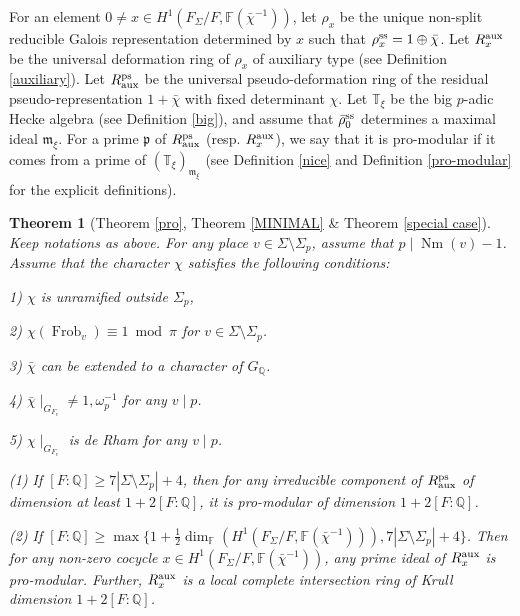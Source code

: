 \documentclass[12pt]{amsart}
\theoremstyle{plain}
\newtheorem{thm}{Theorem}[subsection]
\theoremstyle{definition}
\theoremstyle{remark}
\begin{document}
For an element $0 \ne x \in H^1(F_{\Sigma}/F, \mathbb{F}(\bar{\chi}^{-1}))$, let $\rho_x$ be the unique non-split reducible Galois representation determined by $x$ such that $\rho_x^{\textnormal{ss}}=1 \oplus \bar{\chi}$. Let $R_x^\textnormal{aux}$ be the universal deformation ring of $\rho_x$ of auxiliary type (see Definition \ref{auxiliary}).
  Let $R_\textnormal{aux}^\textnormal{ps} $ be the universal pseudo-deformation ring of the residual pseudo-representation $1+\bar{\chi}$ with fixed determinant $\chi$. Let $\mathbb{T}_{\xi}$ be the big $p$-adic Hecke algebra (see Definition \ref{big}), and assume that $ \bar{\rho}_0^{\textnormal{ss}}$ determines a maximal ideal $\mathfrak{m}_{\xi}$. For a prime $\mathfrak{p}$ of $R_\textnormal{aux}^\textnormal{ps} $ (resp. $R_x^\textnormal{aux}$), we say that it is pro-modular if it comes from a prime of $(\mathbb{T}_{\xi})_{\mathfrak{m}_{\xi}}$ (see Definition \ref{nice} and Definition \ref{pro-modular} for the explicit definitions). 


\begin{thm} [Theorem \ref{pro}, Theorem \ref{MINIMAL} \& Theorem \ref{special case}] \label{main} Keep notations as above. For any place $v \in \Sigma \setminus \Sigma_p$, assume that $p \mid \operatorname{Nm}(v)-1$. Assume that the character $\chi$ satisfies the following conditions:
	
	1) $\chi$ is unramified outside $ \Sigma_p$,
	
	2) $\chi(\operatorname{Frob}_v) \equiv 1~\operatorname{mod}~\pi$ for  
	$v \in \Sigma \setminus \Sigma_p$.
	
	3) $\bar{\chi}$ can be extended to a character of $G_{\mathbb{Q}}$.
	
	4) $\bar{\chi} \mid_{G_{F_v}} \ne 1, \omega_p^{-1}$ for any $v \mid p$.
	
	5) $\chi \mid_{G_{F_v}}$ is de Rham for any $v \mid p$.
	
	(1) If $[F:\mathbb{Q}] \ge 7|\Sigma \setminus \Sigma_p|+4$, then for any irreducible component of $R_\textnormal{aux}^\textnormal{ps} $ of dimension at least $1+2[F:\mathbb{Q}]$, it is pro-modular of dimension $1+2[F:\mathbb{Q}]$.
	
   (2) If $[F:\mathbb{Q}] \ge \operatorname{max}\{1+\frac{1}{2}\operatorname{dim}_{\mathbb{F}}(H^1(F_{\Sigma}/F, \mathbb{F}(\bar{\chi}^{-1}))), 7|\Sigma \setminus \Sigma_p|+4\}$. Then for any non-zero cocycle $x \in H^1(F_{\Sigma}/F, \mathbb{F}(\bar{\chi}^{-1}))$, any prime ideal of $ R_x^\textnormal{aux}$ is pro-modular. Further, $R_x^\textnormal{aux}$ is a local complete intersection ring of Krull dimension $1+2[F:\mathbb{Q}]$.
\end{thm}
\end{document}
